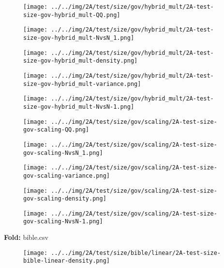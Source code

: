 \begin{figure}[H]
\centering	\texttt{[image: ../../img/2A/test/size/gov/hybrid\_mult/2A-test-size-gov-hybrid\_mult-QQ.png]}
\end{figure}
\begin{figure}[H]
\centering	\texttt{[image: ../../img/2A/test/size/gov/hybrid\_mult/2A-test-size-gov-hybrid\_mult-NvsN\_1.png]}
\end{figure}
\begin{figure}[H]
\centering	\texttt{[image: ../../img/2A/test/size/gov/hybrid\_mult/2A-test-size-gov-hybrid\_mult-density.png]}
\end{figure}
\begin{figure}[H]
\centering	\texttt{[image: ../../img/2A/test/size/gov/hybrid\_mult/2A-test-size-gov-hybrid\_mult-variance.png]}
\end{figure}
\begin{figure}[H]
\centering	\texttt{[image: ../../img/2A/test/size/gov/hybrid\_mult/2A-test-size-gov-hybrid\_mult-NvsN-1.png]}
\end{figure}
\begin{figure}[H]
\centering	\texttt{[image: ../../img/2A/test/size/gov/scaling/2A-test-size-gov-scaling-QQ.png]}
\end{figure}
\begin{figure}[H]
\centering	\texttt{[image: ../../img/2A/test/size/gov/scaling/2A-test-size-gov-scaling-NvsN\_1.png]}
\end{figure}
\begin{figure}[H]
\centering	\texttt{[image: ../../img/2A/test/size/gov/scaling/2A-test-size-gov-scaling-variance.png]}
\end{figure}
\begin{figure}[H]
\centering	\texttt{[image: ../../img/2A/test/size/gov/scaling/2A-test-size-gov-scaling-density.png]}
\end{figure}
\begin{figure}[H]
\centering	\texttt{[image: ../../img/2A/test/size/gov/scaling/2A-test-size-gov-scaling-NvsN-1.png]}
\end{figure}
\textbf{Fold:} bible.csv
\begin{figure}[H]
\centering	\texttt{[image: ../../img/2A/test/size/bible/linear/2A-test-size-bible-linear-density.png]}
\end{figure}
